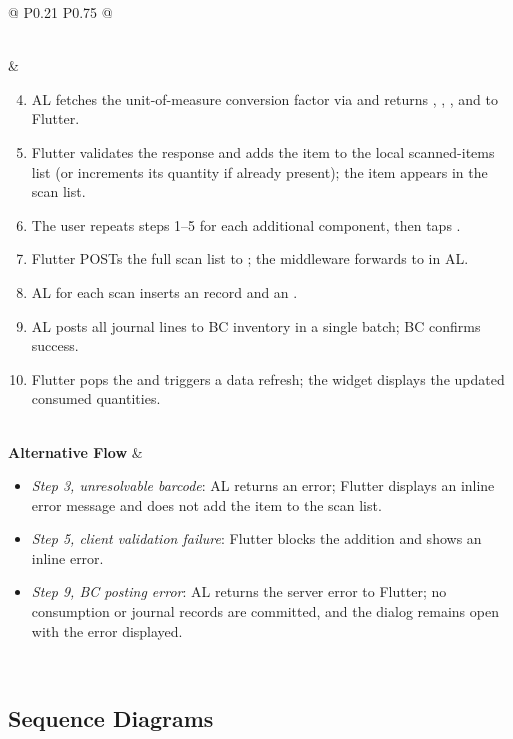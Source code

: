 \begin{longtable}{@{} P{0.21\linewidth} P{0.75\linewidth} @{}}
\begin{enumerate}[nosep, leftmargin=*]
    \end{enumerate} \\ &
    \begin{enumerate}[nosep, leftmargin=*]    
		\setcounter{enumi}{3}
		\item AL fetches the unit-of-measure conversion factor via  and returns , , , and  to Flutter.
        \item Flutter validates the response and adds the item to the local scanned-items list (or increments its quantity if already present); the item appears in the scan list.
        \item The user repeats steps 1--5 for each additional component, then taps .
        \item Flutter POSTs the full scan list to ; the middleware forwards to  in AL.
        \item AL for each scan inserts an  record and an .
        \item AL posts all journal lines to BC inventory in a single batch; BC confirms success.
        \item Flutter pops the  and triggers a data refresh; the  widget displays the updated consumed quantities.
    \end{enumerate} \\
    \midrule
    \textbf{Alternative Flow} &
    \begin{itemize}[nosep, leftmargin=*]
        \item \textit{Step 3, unresolvable barcode}: AL returns an error; Flutter displays an inline error message and does not add the item to the scan list.
        \item \textit{Step 5, client validation failure}: Flutter blocks the addition and shows an inline error.
        \item \textit{Step 9, BC posting error}: AL returns the server error to Flutter; no consumption or journal records are committed, and the dialog remains open with the error displayed.
    \end{itemize} \\
\end{longtable}
\bigskip

\subsection{Sequence Diagrams}

